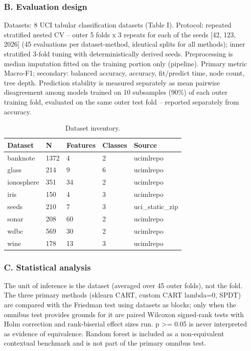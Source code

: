 \documentclass[
  conference]{IEEEtran}
\begin{document}
\subsubsection{B. Evaluation design}\label{b.-evaluation-design}

Datasets: 8 UCI tabular classification datasets (Table I). Protocol:
repeated stratified nested CV -- outer 5 folds x 3 repeats for each of
the seeds {[}42, 123, 2026{]} (45 evaluations per dataset-method,
identical splits for all methods); inner stratified 3-fold tuning with
deterministically derived seeds. Preprocessing is median imputation
fitted on the training portion only (pipeline). Primary metric Macro-F1;
secondary: balanced accuracy, accuracy, fit/predict time, node count,
tree depth. Prediction stability is measured separately as mean pairwise
disagreement among models trained on 10 subsamples (90\%) of each outer
training fold, evaluated on the same outer test fold -- reported
separately from accuracy.

\begin{table}[!tb]
\centering
\caption{Dataset inventory.}
\begin{tabular}{@{}lllll@{}}
\toprule\noalign{}
Dataset & N & Features & Classes & Source \\
\midrule\noalign{}
\bottomrule\noalign{}
banknote & 1372 & 4 & 2 & ucimlrepo \\
glass & 214 & 9 & 6 & ucimlrepo \\
ionosphere & 351 & 34 & 2 & ucimlrepo \\
iris & 150 & 4 & 3 & ucimlrepo \\
seeds & 210 & 7 & 3 & uci\_static\_zip \\
sonar & 208 & 60 & 2 & ucimlrepo \\
wdbc & 569 & 30 & 2 & ucimlrepo \\
wine & 178 & 13 & 3 & ucimlrepo \\
\end{tabular}
\end{table}

\subsubsection{C. Statistical analysis}\label{c.-statistical-analysis}

The unit of inference is the dataset (averaged over 45 outer folds), not
the fold. The three primary methods (sklearn CART, custom CART lambda=0,
SPDT) are compared with the Friedman test using datasets as blocks; only
when the omnibus test provides grounds for it are paired Wilcoxon
signed-rank tests with Holm correction and rank-biserial effect sizes
run. p \textgreater= 0.05 is never interpreted as evidence of
equivalence. Random forest is included as a non-equivalent contextual
benchmark and is not part of the primary omnibus test.
\end{document}
